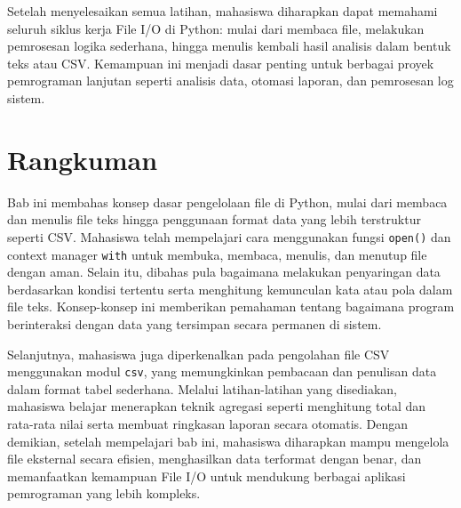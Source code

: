 Setelah menyelesaikan semua latihan, mahasiswa diharapkan dapat memahami seluruh siklus kerja File I/O di Python:  
mulai dari membaca file, melakukan pemrosesan logika sederhana, hingga menulis kembali hasil analisis dalam bentuk teks atau CSV.  
Kemampuan ini menjadi dasar penting untuk berbagai proyek pemrograman lanjutan seperti analisis data, otomasi laporan, dan pemrosesan log sistem.


\section{Rangkuman}

Bab ini membahas konsep dasar pengelolaan file di Python, mulai dari membaca dan menulis file teks hingga penggunaan format data yang lebih terstruktur seperti CSV. Mahasiswa telah mempelajari cara menggunakan fungsi \texttt{open()} dan context manager \texttt{with} untuk membuka, membaca, menulis, dan menutup file dengan aman. Selain itu, dibahas pula bagaimana melakukan penyaringan data berdasarkan kondisi tertentu serta menghitung kemunculan kata atau pola dalam file teks. Konsep-konsep ini memberikan pemahaman tentang bagaimana program berinteraksi dengan data yang tersimpan secara permanen di sistem.

Selanjutnya, mahasiswa juga diperkenalkan pada pengolahan file CSV menggunakan modul \texttt{csv}, yang memungkinkan pembacaan dan penulisan data dalam format tabel sederhana. Melalui latihan-latihan yang disediakan, mahasiswa belajar menerapkan teknik agregasi seperti menghitung total dan rata-rata nilai serta membuat ringkasan laporan secara otomatis. Dengan demikian, setelah mempelajari bab ini, mahasiswa diharapkan mampu mengelola file eksternal secara efisien, menghasilkan data terformat dengan benar, dan memanfaatkan kemampuan File I/O untuk mendukung berbagai aplikasi pemrograman yang lebih kompleks.



